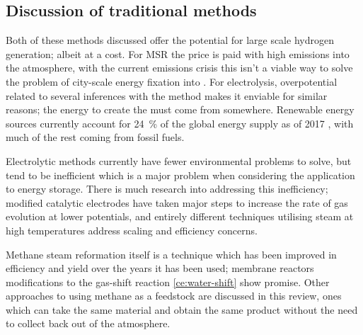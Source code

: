 \subsection{Discussion of traditional methods}%
\label{sub:discussion_of_traditional_methods}
Both of these methods discussed offer the potential for large scale hydrogen generation; albeit at a cost.
For MSR the price is paid with high emissions into the atmosphere, with the current  emissions crisis this isn't a viable way to solve the problem of city-scale energy fixation into .
For electrolysis, overpotential related to several inferences with the method makes it enviable for similar reasons; the energy to create the  must come from somewhere.
Renewable energy sources currently account for \SI{24}{\percent} of the global energy supply as of 2017 \cite{}, with much of the rest coming from fossil fuels.

Electrolytic methods currently have fewer environmental problems to solve, but tend to be inefficient which is a major problem when considering the application to energy storage.
There is much research into addressing this inefficiency; modified catalytic electrodes have taken major steps to increase the rate of gas evolution at lower potentials, and entirely different techniques utilising steam at high temperatures address scaling and efficiency concerns.

Methane steam reformation itself is a technique which has been improved in efficiency and yield over the years it has been used; membrane reactors \cite{} modifications to the gas-shift reaction \eqref{ce:water-shift}\cite{Saxena2011} show promise.
Other approaches to using methane as a feedstock are discussed in this review, ones which can take the same material and obtain the same product without the need to collect  back out of the atmosphere.
